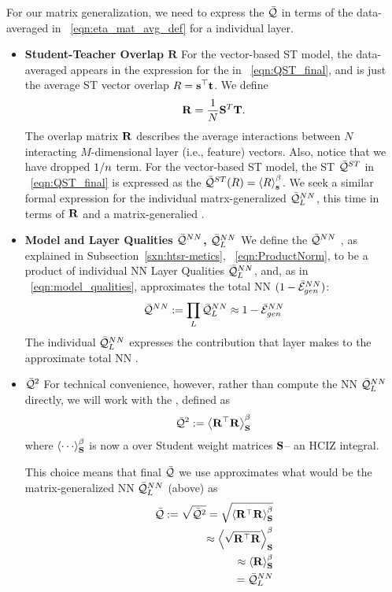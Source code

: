 For our matrix generalization, we need to express the \LayerQuality $\bar{\mathcal{Q}}$ in terms of the data-averaged
\SelfOverlap in \EQN~\ref{eqn:eta_mat_avg_def} for a individual layer.
\begin{itemize}
\item
\textbf{Student-Teacher Overlap  $\mathbf{R}$}
For the vector-based \Perceptron ST model, the data-averaged \SelfOverlap appears in the expression for the
\LayerQuality  in \EQN~\ref{eqn:QST_final}, and is just the average ST vector overlap $R={\mathbf{s}}^{\top}{\mathbf{t}}$. 
We define 
\begin{equation}
\mathbf{R} =  \frac{1}{N}{\mathbf{S}}^{T} {\mathbf{T}}  .
\end{equation}
The overlap matrix $\mathbf{R}$ describes the average interactions between $N$ interacting $M$-dimensional layer (i.e., feature) vectors.  Also, notice that we have dropped $1/n$ term.
For the vector-based ST model, the ST \Quality $\bar{\mathcal{Q}}^{ST}$ in \EQN~\ref{eqn:QST_final} is expressed as
the \ThermalAverage $\bar{\mathcal{Q}}^{ST}(R)=\left\langle R \right\rangle_{\mathbf s}^{\beta}$. We seek a similar formal expression for the individual matrx-generalized \LayerQuality $\bar{\mathcal{Q}}^{NN}_{L}$, this time in terms of $\mathbf{R}$ and a matrix-generalied \ThermalAverage.
\item
\textbf{Model and Layer Qualities $\bar{\mathcal{Q}}^{NN}$, $\bar{\mathcal{Q}}^{NN}_{L}$}
We define the \ModelQuality $\bar{\mathcal{Q}}^{NN}$ ,
as explained in Subsection~\ref{sxn:htsr-metics}, \EQN~\ref{eqn:ProductNorm},
to be a product of individual NN Layer Qualities $\bar{\mathcal{Q}}^{NN}_{L}$,
and, as in \EQN~\ref{eqn:model_qualities},
approximates the total NN \AverageGeneralizationAccuracy $(1-\bar{\mathcal{E}}_{gen}^{NN})$:
\begin{equation}
 \bar{\mathcal{Q}}^{NN}:=\prod_{L}\bar{\mathcal{Q}}^{NN}_{L}\approx 1-\bar{\mathcal{E}}_{gen}^{NN} 
\end{equation}
The individual $\bar{\mathcal{Q}}^{NN}_{L}$ expresses the contribution that layer makes
to the approximate total NN \AverageGeneralizationAccuracy.
\item
 \textbf{\LayerQualitySquared $\bar{\mathcal{Q}}^{2}$}
For  technical convenience, however, rather than compute
the NN \LayerQuality $\bar{\mathcal{Q}}^{NN}_{L}$ directly, we will work with the \emph{\AverageLayerQualitySquared}, 
defined as
\begin{align}
  \label{eqn:QT_1}
  \bar{\mathcal{Q}}^{2}:=\left\langle {\mathbf{R}}^{\top}\mathbf{R} \right\rangle_{\mathbf S}^{\beta}
\end{align}
where  $\THRMAVGIZ{\cdots}$ is now a \ThermalAverage over Student weight matrices ${\mathbf{S}}$--
an HCIZ integral.

This choice means that final \LayerQuality $\bar{\mathcal{Q}}$ we use approximates what would be the
matrix-generalized NN \LayerQuality $\bar{\mathcal{Q}}^{NN}_{L}$ (above) as
\begin{align}
  \label{eqn:QT_2}
  \bar{\mathcal{Q}}:=\sqrt{\bar{\mathcal{Q}}^{2}}
  =\sqrt{\left\langle {\mathbf{R}}^{\top}\mathbf{R} \right\rangle_{\mathbf S}^{\beta}} \\ \nonumber
  \approx\left\langle \sqrt{{\mathbf{R}}^{\top}\mathbf{R}} \right\rangle_{\mathbf S}^{\beta} \\ \nonumber
  \approx\left\langle \mathbf{R} \right\rangle_{\mathbf S}^{\beta} \\ \nonumber
  = \bar{\mathcal{Q}}^{NN}_{L}
\end{align}


\end{itemize}
